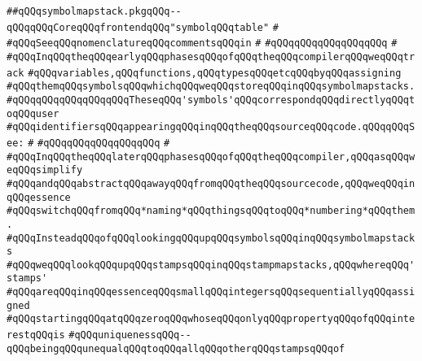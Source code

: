 \label{src/lib/compiler/front/typer-stuff/symbolmapstack/symbolmapstack.pkg}
\verb|##qQQqsymbolmapstack.pkgqQQq--qQQqqQQqCoreqQQqfrontendqQQq"symbolqQQqtable"|\newline
\verb|#|\newline
\verb|#qQQqSeeqQQqnomenclatureqQQqcommentsqQQqin|\newline
\verb|#|\newline
\verb|#qQQqqQQqqQQqqQQqqQQq|\newline
\verb|#|\newline
\verb|#qQQqInqQQqtheqQQqearlyqQQqphasesqQQqofqQQqtheqQQqcompilerqQQqweqQQqtrack|\newline
\verb|#qQQqvariables,qQQqfunctions,qQQqtypesqQQqetcqQQqbyqQQqassigning|\newline
\verb|#qQQqthemqQQqsymbolsqQQqwhichqQQqweqQQqstoreqQQqinqQQqsymbolmapstacks.|\newline
\verb|#qQQqqQQqqQQqqQQqqQQqTheseqQQq'symbols'qQQqcorrespondqQQqdirectlyqQQqtoqQQquser|\newline
\verb|#qQQqidentifiersqQQqappearingqQQqinqQQqtheqQQqsourceqQQqcode.qQQqqQQqSee:|\newline
\verb|#|\newline
\verb|#qQQqqQQqqQQqqQQqqQQq|\newline
\verb|#|\newline
\verb|#qQQqInqQQqtheqQQqlaterqQQqphasesqQQqofqQQqtheqQQqcompiler,qQQqasqQQqweqQQqsimplify|\newline
\verb|#qQQqandqQQqabstractqQQqawayqQQqfromqQQqtheqQQqsourcecode,qQQqweqQQqinqQQqessence|\newline
\verb|#qQQqswitchqQQqfromqQQq*naming*qQQqthingsqQQqtoqQQq*numbering*qQQqthem.|\newline
\verb|#qQQqInsteadqQQqofqQQqlookingqQQqupqQQqsymbolsqQQqinqQQqsymbolmapstacks|\newline
\verb|#qQQqweqQQqlookqQQqupqQQqstampsqQQqinqQQqstampmapstacks,qQQqwhereqQQq'stamps'|\newline
\verb|#qQQqareqQQqinqQQqessenceqQQqsmallqQQqintegersqQQqsequentiallyqQQqassigned|\newline
\verb|#qQQqstartingqQQqatqQQqzeroqQQqwhoseqQQqonlyqQQqpropertyqQQqofqQQqinterestqQQqis|\newline
\verb|#qQQquniquenessqQQq--qQQqbeingqQQqunequalqQQqtoqQQqallqQQqotherqQQqstampsqQQqof|\newline

